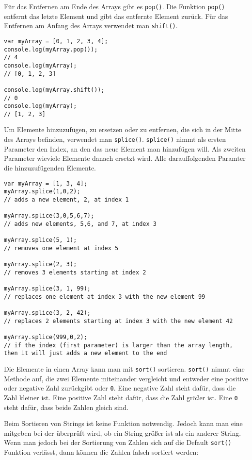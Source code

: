 \documentclass{book}
\begin{document}
Für das Entfernen am Ende des Arrays gibt es \lstinline|pop()|. Die Funktion \lstinline|pop()| entfernt das letzte Element und gibt das entfernte Element zurück. Für das Entfernen am Anfang des Arrays verwendet man \lstinline|shift()|. 

\begin{lstlisting}[caption=Array Konstruktor]
var myArray = [0, 1, 2, 3, 4];
console.log(myArray.pop());
// 4
console.log(myArray); 
// [0, 1, 2, 3]

console.log(myArray.shift());
// 0
console.log(myArray); 
// [1, 2, 3]
\end{lstlisting}

Um Elemente hinzuzufügen, zu ersetzen oder zu entfernen, die sich in der Mitte des Arrays befinden, verwendet man \lstinline|splice()|. \lstinline|splice()| nimmt als ersten Parameter den Index, an den das neue Element man hinzufügen will. Als zweiten Parameter wieviele Elemente danach ersetzt wird. Alle darauffolgenden Paramter die hinzuzufügenden Elemente.

\begin{lstlisting}[caption=Array Konstruktor]
var myArray = [1, 3, 4];
myArray.splice(1,0,2); 
// adds a new element, 2, at index 1

myArray.splice(3,0,5,6,7); 
// adds new elements, 5,6, and 7, at index 3

myArray.splice(5, 1); 
// removes one element at index 5

myArray.splice(2, 3); 
// removes 3 elements starting at index 2

myArray.splice(3, 1, 99); 
// replaces one element at index 3 with the new element 99

myArray.splice(3, 2, 42); 
// replaces 2 elements starting at index 3 with the new element 42

myArray.splice(999,0,2); 
// if the index (first parameter) is larger than the array length, then it will just adds a new element to the end
\end{lstlisting}

Die Elemente in einen Array kann man mit \lstinline|sort()| sortieren. \lstinline|sort()| nimmt eine Methode auf, die zwei Elemente miteinander vergleicht und entweder eine positive oder negative Zahl zurückgibt oder \lstinline|0|. Eine negative Zahl steht dafür, dass die Zahl kleiner ist. Eine positive Zahl steht dafür, dass die Zahl größer ist. Eine \lstinline|0| steht dafür, dass beide Zahlen gleich sind.

Beim Sortieren von Strings ist keine Funktion notwendig. Jedoch kann man eine mitgeben bei der überprüft wird, ob ein String größer ist als ein anderer String. Wenn man jedoch bei der Sortierung von Zahlen sich auf die Default \lstinline|sort()| Funktion verlässt, dann können die Zahlen falsch sortiert werden:
\end{document}

